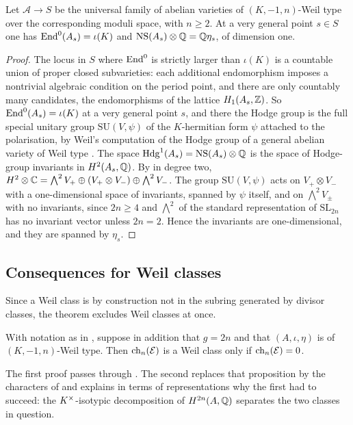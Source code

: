 \begin{lemma}\label{lem:genericNS}
Let $\mathcal{A}\to S$ be the universal family of abelian varieties of
$(K,-1,n)$-Weil type over the corresponding moduli space, with $n\ge2$. At a
very general point $s\in S$ one has $\operatorname{End}^{0}(A_{s})=\iota(K)$ and
$\mathrm{NS}(A_{s})\otimes\mathbb{Q}=\mathbb{Q}\eta_{s}$, of dimension one.
\end{lemma}

\begin{proof}
The locus in $S$ where $\operatorname{End}^{0}$ is strictly larger than $\iota(K)$ is a
countable union of proper closed subvarieties: each additional endomorphism
imposes a nontrivial algebraic condition on the period point, and there are
only countably many candidates, the endomorphisms of the lattice
$H_{1}(A_{s},\mathbb{Z})$. So $\operatorname{End}^{0}(A_{s})=\iota(K)$ at a very general point
$s$, and there the Hodge group is the full special unitary group
$\mathrm{SU}(V,\psi)$ of the $K$-hermitian form $\psi$ attached to the
polarisation, by Weil's computation of the Hodge group of a general abelian
variety of Weil type \cite{Weil77}. The space
$\mathrm{Hdg}^{1}(A_{s})=\mathrm{NS}(A_{s})\otimes\mathbb{Q}$ is the space of Hodge-group invariants
in $H^{2}(A_{s},\mathbb{Q})$. By  in degree two,
$H^{2}\otimes\mathbb{C}=\bigwedge^{2}V_{+}\oplus(V_{+}\otimes V_{-})\oplus\bigwedge^{2}V_{-}$.
The group $\mathrm{SU}(V,\psi)$ acts on $V_{+}\otimes V_{-}$ with a
one-dimensional space of invariants, spanned by $\psi$ itself, and on
$\bigwedge^{2}V_{\pm}$ with no invariants, since $2n\ge4$ and $\bigwedge^{2}$
of the standard representation of $\mathrm{SL}_{2n}$ has no invariant vector
unless $2n=2$. Hence the invariants are one-dimensional, and they are spanned
by $\eta_{s}$.
\end{proof}

\subsection{Consequences for Weil classes}

Since a Weil class is by construction not in the subring generated by divisor
classes, the theorem excludes Weil classes at once.

\begin{corollary}\label{cor:neverweil}
With notation as in , suppose in addition that $g=2n$ and
that $(A,\iota,\eta)$ is of $(K,-1,n)$-Weil type. Then $\operatorname{ch}_{n}(\mathcal{E})$ is a
Weil class only if $\operatorname{ch}_{n}(\mathcal{E})=0$.
\end{corollary}

The first proof passes through . The second replaces that
proposition by the characters of  and explains in terms
of representations why the first had to succeed: the $K^{\times}$-isotypic
decomposition of $H^{2n}(A,\mathbb{Q})$ separates the two classes in question.


